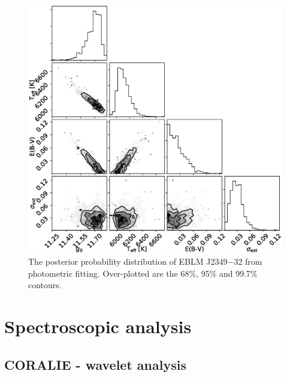 \begin{figure}
    \centering
    \includegraphics[scale=0.6]{7-images/SED_corner_J2349-32.eps}
    \caption{The posterior probability distribution of EBLM J2349$-$32 from photometric fitting. Over-plotted are the 68\%, 95\% and 99.7\% contours.}
    \label{methods:fig:SED_J2349-32}
\end{figure}







\section{Spectroscopic analysis}\label{methods:atmospheric_parameters}

\subsection{CORALIE - wavelet analysis}\label{methods:spectroscopy:wavelet}

